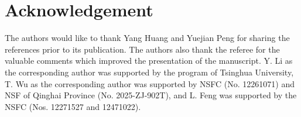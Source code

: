 \documentclass[11pt,a4paper]{article}
\begin{document}



\section*{Acknowledgement}
The authors would like to thank Yang Huang and Yuejian Peng for sharing the references \cite{Huang2025} prior to its publication.  
The authors also thank the referee for the valuable comments  which improved the presentation of the manuscript. 
Y. Li as the corresponding author was supported by the program of Tsinghua University,
 T. Wu as the corresponding author was supported by NSFC (No. 12261071) and NSF of Qinghai Province (No. 2025-ZJ-902T),  
 and L. Feng was supported by the NSFC (Nos. 12271527 and 12471022). 
\end{document}
